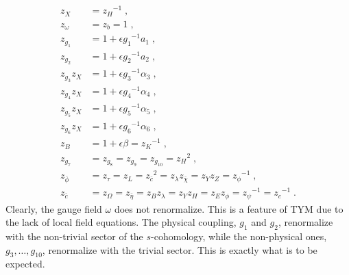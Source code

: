 \documentclass[../main.tex]{subfiles}
\begin{document}
\begin{subequations}%
  \label{eq:z-factors}
  \begin{align}
    z_{ X }               & = { z_{ H } }^{ -1 } \;,                                                                                                                          \\
    z_{ \omega }          & = z_{ b } = 1 \;,                                                                                                                                 \\
    z_{ g_{ 1 } }         & = 1 + \epsilon { g_{ 1 } }^{ -1 } a_{ 1 } \;,                                                                                                     \\
    z_{ g_{ 2 } }         & = 1 + \epsilon { g_{ 2 } }^{ -1 } a_{ 2 } \;,                                                                                                     \\
    z_{ g_{ 3 } } z_{ X } & = 1 + \epsilon { g_{ 3 } }^{ -1 } \alpha_{ 3 } \;,                                                                                                \\
    z_{ g_{ 4 } } z_{ X } & = 1 + \epsilon { g_{ 4 } }^{ -1 } \alpha_{ 4 } \;,                                                                                                \\
    z_{ g_{ 5 } } z_{ X } & = 1 + \epsilon { g_{ 5 } }^{ -1 } \alpha_{ 5 } \;,                                                                                                \\
    z_{ g_{ 6 } } z_{ X } & = 1 + \epsilon { g_{ 6 } }^{ -1 } \alpha_{ 6 } \;,                                                                                                \\
    z_{ B }               & = 1 + \epsilon \beta = { z_{ K } }^{ -1 } \;,                                                                                                     \\
    z_{ g_{ 7 } }         & = z_{ g_{ 8 } } =  z_{ g_{ 9 } } = z_{ g_{ 10 } }  = { z_{ H } }^{ 2 } \;,                                                                        \\
    z_{ \bar{ \phi } }    & = z_{ \tau } = z_{ L } = {z_{ \bar{ c } }}^{ 2 } = z_{ \lambda } z_{ \bar{ \chi } } = z_{ Y } z_{ Z } = {z_{ \phi } }^{ -1 } \;,                  \\
    z_{ \bar{ c } }       & = z_{ \Omega } = z_{ \bar{ \eta } } = z_{ B } z_{ \lambda } = z_{ Y } z_{ H } = z_{ E } z_{ \phi } = {z_{ \psi } }^{ -1 } = {z_{ c } }^{ -1 } \;.
  \end{align}
\end{subequations}
Clearly, the gauge field $ \omega $ does not renormalize. This is a feature of TYM due to the lack of local field equations. The physical coupling, $ g_1 $ and $ g_2 $, renormalize with the non-trivial sector of the $ s $-cohomology, while the non-physical ones, $ g_3, \ldots, g_{10} $, renormalize with the trivial sector. This is exactly what is to be expected.
\end{document}
